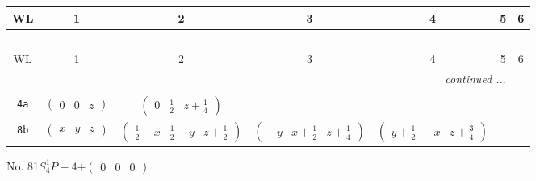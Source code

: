 \documentclass[fleqn,9pt,landscape]{jsarticle}
\begin{document}
\begin{center}
\renewcommand{\arraystretch}{1.2}
\begin{longtable}{ccccccc}
 \hline \hline
WL & 1 & 2 & 3 & 4 & 5 & 6 \\ \hline \endfirsthead

\multicolumn{6}{l}{\tablename\ \thetable{}} \\
 \hline \hline
WL & 1 & 2 & 3 & 4 & 5 & 6 \\ \hline \endhead

 \hline \hline
\multicolumn{6}{r}{\footnotesize\it continued ...} \\ \endfoot

 \hline \hline
\multicolumn{6}{r}{} \\ \endlastfoot

{\tt 4a} & $ \begin{pmatrix} 0 & 0 & z \end{pmatrix} $ & $ \begin{pmatrix} 0 & \frac{1}{2} & z + \frac{1}{4} \end{pmatrix} $ & $  $ & $  $ \\ \hline
{\tt 8b} & $ \begin{pmatrix} x & y & z \end{pmatrix} $ & $ \begin{pmatrix} \frac{1}{2} - x & \frac{1}{2} - y & z + \frac{1}{2} \end{pmatrix} $ & $ \begin{pmatrix} - y & x + \frac{1}{2} & z + \frac{1}{4} \end{pmatrix} $ & $ \begin{pmatrix} y + \frac{1}{2} & - x & z + \frac{3}{4} \end{pmatrix} $ \\
\end{longtable}
\end{center}
\newpage
No. 81\quad$S_{4}^{1}$\quad$P-4$\quad[ tetragonal ]\quad$+\begin{pmatrix} 0 & 0 & 0 \end{pmatrix}$
\end{document}
